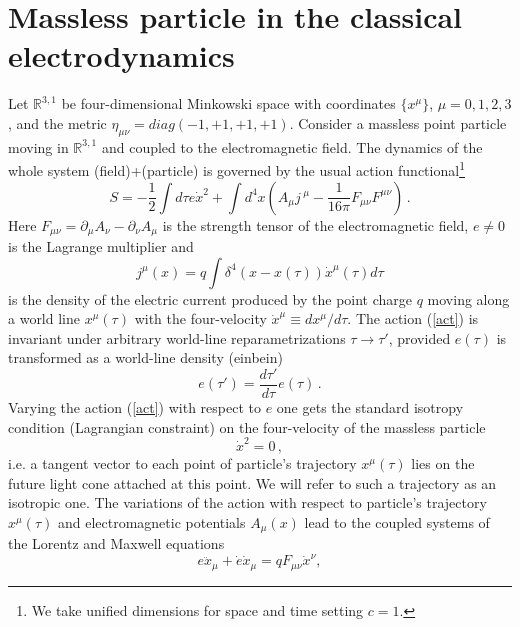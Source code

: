 \documentclass[a4paper,12pt]{article}
\begin{document}
\section{Massless particle in the classical electrodynamics}



Let $\mathbb{R}^{3,1}$ be four-dimensional Minkowski space with
coordinates $\{x^\mu\}$, $\mu =0,1,2,3$, and the metric
$\eta_{\mu\nu}=diag(-1,+1,+1,+1)$. Consider a massless point
particle moving in $\mathbb{R}^{3,1}$ and coupled to the
electromagnetic field. The dynamics of the whole system
(field)+(particle) is governed by the usual action
functional\footnote{We take unified dimensions for space and time
setting $c=1$.}
\begin{equation}\label{act}
S=-\frac12\int d\tau e\dot{x}^2 +\int d^4x \left( A_{\mu}j
\,{}^{\mu}-\frac{1}{16\pi} F_{\mu\nu}F^{\mu\nu}\right)\,.
\end{equation}
Here $F_{\mu\nu}=\partial_\mu A_\nu-\partial_\nu A_\mu$ is the
strength tensor of the electromagnetic field, $e\neq 0$ is the
Lagrange multiplier and
\begin{equation} \label{curr}
j^{\mu}(x)=q\int{\delta^4(x-x(\tau))\dot{x}^{\mu}(\tau)d\tau}
\end{equation}
is the density of the electric current produced by the point
charge $q$ moving along a world line $x^\mu(\tau)$ with the
four-velocity $\dot{x}^\mu \equiv dx^\mu/d\tau$. The action
(\ref{act}) is invariant under  arbitrary world-line
reparametrizations $\tau\rightarrow\tau'$, provided $e(\tau)$ is
transformed as a world-line density (einbein)
\begin{equation} \label{tp}
e(\tau')= \frac{d\tau'}{d\tau}e(\tau)\,.
\end{equation}
Varying the action (\ref{act}) with respect to $e$ one gets the
standard isotropy condition (Lagrangian constraint) on the
four-velocity of the massless particle
\begin{equation}\label{is}
\dot{x}^2=0\,,
\end{equation}
i.e. a tangent vector to each point of particle's trajectory
$x^\mu(\tau)$ lies on the future light cone attached at this
point. We will refer to such a trajectory as an isotropic one. The
variations of the action with respect to particle's trajectory
$x^\mu(\tau)$ and electromagnetic potentials $A_\mu(x)$ lead to
the coupled systems of the Lorentz and Maxwell equations
\begin{equation} \label{leq}
e\ddot{x}_\mu+\dot{e}\dot{x}_\mu=qF_{\mu\nu}\dot{x}^{\nu},
\end{equation}
\end{document}
